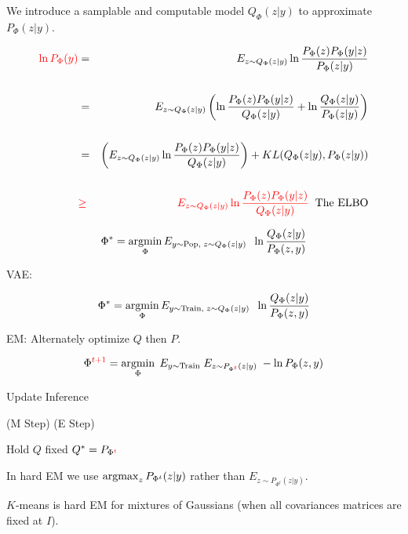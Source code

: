 {

We introduce a samplable and computable model $Q_\Phi(z|y)$ to approximate $P_\Phi(z|y)$.

{\huge
\begin{eqnarray*}
 {\color{red} \ln P_\Phi(y)} & = & E_{z \sim Q_\Phi(z|y)} \ln \frac{P_\Phi(z)P_\Phi(y|z)}{P_\Phi(z|y)} \\
        \\
 & = & E_{z \sim Q_\Phi(z|y)} \left(\ln \frac{P_\Phi(z)P_\Phi(y|z)}{Q_\Phi(z|y)} + \ln \frac{Q_\Phi(z|y)}{P_\Phi(z|y)}\right) \\
 \\
  & = & \left(E_{z \sim Q_\Phi(z|y)} \ln \frac{P_\Phi(z)P_\Phi(y|z)}{Q_\Phi(z|y)}\right) + KL(Q_\Phi(z|y),P_\Phi(z|y)) \\
  \\
  & {\color{red} \geq} & {\color{red} E_{z \sim Q_\Phi(z|y)} \ln \frac{P_\Phi(z)P_\Phi(y|z)}{Q_\Phi(z|y)}}\;\;\mbox{The ELBO}
\end{eqnarray*}
}


$$\Phi^* = \operatorname*{argmin}_\Phi E_{y\sim \mathrm{Pop},\;z \sim Q_\Phi(z|y)}\;\;\ln \frac{Q_\Phi(z|y)}{P_\Phi(z,y)}$$


VAE:

$$\Phi^* = \operatorname*{argmin}_\Phi E_{y\sim \mathrm{Train},\;z \sim Q_\Phi(z|y)}\;\;\ln \frac{Q_\Phi(z|y)}{P_\Phi(z,y)}$$

\vfill
EM:  Alternately optimize $Q$ then $P$.

$$\Phi^{\color{red} t+1} =  \operatorname*{argmin}_\Phi\;E_{y \sim \mathrm{Train}}\;E_{z \sim P_{\Phi^{\color{red} t}}(z|y)}\; - \ln P_\Phi(z,y)$$
\centerline{\hspace{1em} Update \hspace{6em} Inference \hspace{2.5em}~}
\centerline{(M Step) \hspace{5em} (E Step) \hspace{1.5em}~}
\centerline{Hold $Q$ fixed \hspace{4em} $Q^* = P_{\Phi^{\color{red} t}}$ \hspace{1.5em}~}

\vfill
In hard EM we use $\operatorname*{argmax}_z P_{\Phi^t}(z|y)$ rather than $E_{z \sim P_{\Phi^t}(z|y)}$.

\vfill
$K$-means is hard EM for mixtures of Gaussians (when all covariances matrices are fixed at $I$).

}
